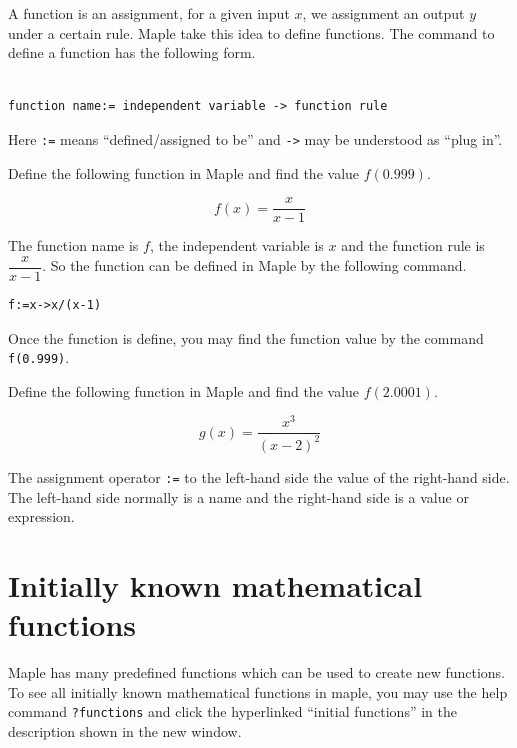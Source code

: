 \documentclass[]{book}
\theoremstyle{definition}
\theoremstyle{definition}
\theoremstyle{definition}
\theoremstyle{remark}
\let\BeginKnitrBlock\begin \let\EndKnitrBlock\end
\begin{document}
A function is an assignment, for a given input \(x\), we assignment an output \(y\) under a certain rule. Maple take this idea to define functions. The command to define a function has the following form.

\begin{verbatim}

function name:= independent variable -> function rule
\end{verbatim}

Here \texttt{:=} means ``defined/assigned to be'' and \texttt{-\textgreater{}} may be understood as ``plug in''.

\BeginKnitrBlock{example}
\protect\hypertarget{exm:unnamed-chunk-1}{}{\label{exm:unnamed-chunk-1} }
Define the following function in Maple and find the value \(f(0.999)\).

\[
f(x)=\dfrac{x}{x-1}
\]
\EndKnitrBlock{example}

\BeginKnitrBlock{solution}
{}The function name is \(f\), the independent variable is \(x\) and the function rule is \(\dfrac{x}{x-1}\). So the function can be defined in Maple by the following command.

\begin{verbatim}
f:=x->x/(x-1)
\end{verbatim}

Once the function is define, you may find the function value by the command \texttt{f(0.999)}.
\EndKnitrBlock{solution}

\BeginKnitrBlock{exercise}
\protect\hypertarget{exr:unnamed-chunk-3}{}{\label{exr:unnamed-chunk-3} }
Define the following function in Maple and find the value \(f(2.0001)\).

\[
g(x)=\dfrac{x^3}{(x-2)^2}
\]
\EndKnitrBlock{exercise}

\BeginKnitrBlock{remark}
{}
The assignment operator \texttt{:=} to the left-hand side the value of the right-hand side. The left-hand side normally is a name and the right-hand side is a value or expression.
\EndKnitrBlock{remark}

\hypertarget{initially-known-mathematical-functions}{%
\section{Initially known mathematical functions}\label{initially-known-mathematical-functions}}

Maple has many predefined functions which can be used to create new functions. To see all initially known mathematical functions in maple, you may use the help command \texttt{?functions} and click the hyperlinked ``initial functions'' in the description shown in the new window.
\end{document}
